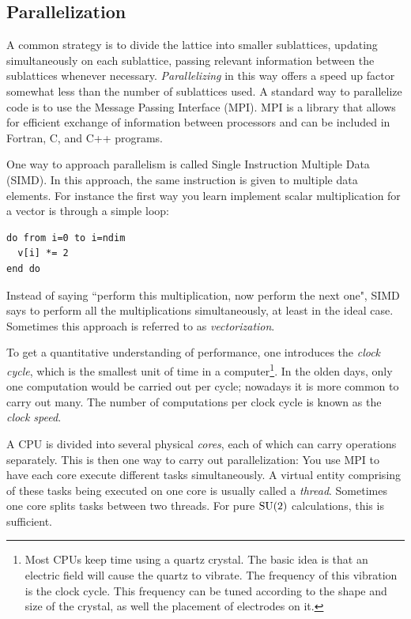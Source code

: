 \subsection{Parallelization}

A common strategy is to divide the lattice into smaller sublattices, updating
simultaneously on each sublattice, passing relevant information between the
sublattices whenever necessary. {\it Parallelizing} 
in this way offers a speed
up factor somewhat less than the number of sublattices used. A standard way to
parallelize code is to use the Message Passing Interface (MPI). MPI 
is a library that allows for efficient exchange of information between processors 
and can be included in Fortran, C, and C++ programs.

One way to approach parallelism is called Single Instruction Multiple
Data (SIMD). In this approach, the same instruction is given to
multiple data elements. For instance the first way you learn implement scalar
multiplication for a vector is through a simple loop:
\begin{verbatim}
do from i=0 to i=ndim
  v[i] *= 2
end do
\end{verbatim}
Instead of saying ``perform this multiplication, now perform the next one", SIMD
says to perform all the multiplications simultaneously, at least in the ideal
case. Sometimes this approach is referred to as {\it
vectorization}.

To get a quantitative understanding of performance, one introduces
the {\it clock cycle}, which is the smallest unit of
time in a computer\footnote{Most CPUs keep time using a quartz crystal.
The basic idea is that an electric field will cause the quartz to
vibrate. The frequency of this vibration is the clock cycle.
This frequency can be tuned according to the shape and size of the
crystal, as well the placement of electrodes on it.}.
In the olden days, only one computation would be carried out per cycle;
nowadays it is more common to carry out many. The number of
computations per clock cycle is known as the {\it clock speed}.

A CPU is divided into several physical {\it cores}, each of which can
carry operations separately. This is then one way to carry out parallelization:
You use MPI to have each core execute different tasks simultaneously.
A virtual entity comprising of these tasks being executed on one core
is usually called a {\it thread}. Sometimes one core splits
tasks between two threads. For pure $\operatorname{SU}(2)$ calculations, this
is sufficient.

